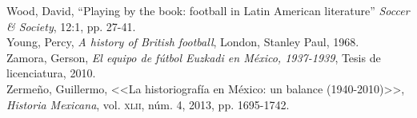 \documentclass[11pt,a5paper,twoside]{book} %
\begin{document}
\begin{hangparas}{1cm}{1}
\noindent Wood, David, “Playing by the book: football in Latin American literature” \emph{Soccer \& Society}, 12:1, pp. 27-41. \\

\noindent Young, Percy, \emph{A history of British football}, London, Stanley Paul, 1968. \\

\noindent Zamora, Gerson, \emph{El equipo de fútbol Euzkadi en México, 1937-1939}, Tesis de licenciatura, 2010. \\

\noindent Zermeño, Guillermo, <<La historiografía en México: un balance (1940-2010)>>, \emph{Historia Mexicana}, vol. \textsc{xlii}, núm. 4, 2013, pp. 1695-1742. \\

\end{hangparas} %


\newpage
\pagestyle{empty}
\null\vfill
{}

\end{document}
